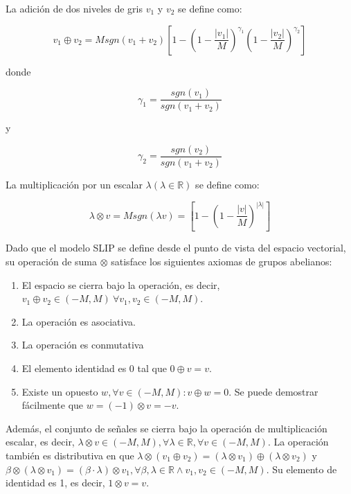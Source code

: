 La adición de dos niveles de gris $v_1$ y $v_2$ se define como:

\begin{equation}
	v_1\oplus v_2=Msgn(v_1+v_2)\left[1-\left(1-\frac{|v_1|}{M}\right)^{\gamma_1}\left(1-\frac{|v_2|}{M}\right)^{\gamma_2}\right]
\end{equation}

donde

\begin{equation}
	\gamma_1=\frac{sgn(v_1)}{sgn(v_1+v_2)}
\end{equation}

y

\begin{equation}
	\gamma_2=\frac{sgn(v_2)}{sgn(v_1+v_2)}
\end{equation}

La multiplicación por un escalar $\lambda (\lambda \in \mathbb{R})$ se define como:

\begin{equation}
	\lambda \otimes v = Msgn(\lambda v)=\left[1-\left(1-\frac{|v|}{M}\right)^{|\lambda|}\right]
\end{equation}

Dado que el modelo SLIP se define desde el punto de vista del espacio vectorial, su operación de suma $\otimes$ satisface los siguientes axiomas de grupos abelianos:

\begin{enumerate}
	\item El espacio se cierra bajo la operación, es decir, $v_1\oplus v_2 \in (-M, M )~\forall v_1, v_2 \in (-M, M )$.
	\item La operación es asociativa.
	\item La operación es conmutativa
	\item El elemento identidad es $0$ tal que $0\oplus v = v$.
	\item  Existe un opuesto $w, \forall v \in (-M, M ): v \oplus w = 0$.  Se puede demostrar fácilmente que $w = (-1)\otimes v = -v $.
\end{enumerate}
  
Además, el conjunto de señales se cierra bajo la operación de multiplicación escalar, es decir, $\lambda \otimes v \in (-M, M), \forall \lambda \in \mathbb{R}, \forall v \in (-M, M)$. La operación también es distributiva en que $\lambda \otimes (v_1\oplus v_2) = (\lambda \otimes v_1 )\oplus (\lambda\otimes v_2)$ y $\beta\otimes (\lambda\otimes v_1 ) = (\beta \cdot \lambda)\otimes v_1, \forall \beta, \lambda \in \mathbb{R} \land v_1 , v_2 \in (-M, M)$. Su elemento de identidad es 1, es decir, $1\otimes v = v $.

